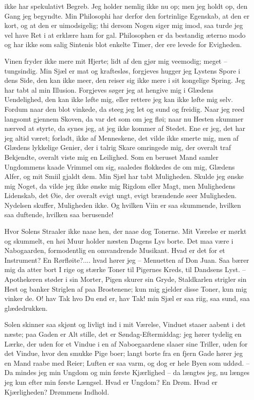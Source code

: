 \documentclass[12pt,a4paper]{article}
\begin{document}
ikke har spekulativt Begreb. Jeg holder nemlig ikke nu op; men jeg holdt op, den Gang jeg begyndte. Min Philosophi har derfor den fortrinlige Egenskab, at den er kort, og at den er uimodsigelig; thi dersom Nogen siger mig imod, saa turde jeg vel have Ret i at erklære ham for gal. Philosophen er da bestandig æterno modo og har ikke som salig Sintenis blot enkelte Timer, der ere levede for Evigheden.

Vinen fryder ikke mere mit Hjerte; lidt af den gjør mig veemodig; meget – tungsindig. Min Sjæl er mat og kraftesløs, forgjeves hugger jeg Lystens Spore i dens Side, den kan ikke meer, den reiser sig ikke mere i sit kongelige Spring. Jeg har tabt al min Illusion. Forgjeves søger jeg at hengive mig i Glædens Uendelighed, den kan ikke løfte mig, eller rettere jeg kan ikke løfte mig selv. Fordum naar den blot vinkede, da steeg jeg let og sund og freidig. Naar jeg reed langsomt gjennem Skoven, da var det som om jeg fløi; naar nu Hesten skummer nærved at styrte, da synes jeg, at jeg ikke kommer af Stedet. Ene er jeg, det har jeg altid været; forladt, ikke af Menneskene, det vilde ikke smerte mig, men af Glædens lykkelige Genier, der i talrig Skare omringede mig, der overalt traf Bekjendte, overalt viste mig en Leilighed. Som en beruset Mand samler Ungdommens kaade Vrimmel om sig, saaledes flokkedes de om mig, Glædens Alfer, og mit Smiil gjaldt dem. Min Sjæl har tabt Muligheden. Skulde jeg ønske mig Noget, da vilde jeg ikke ønske mig Rigdom eller Magt, men Mulighedens Lidenskab, det Øie, der overalt evigt ungt, evigt brændende seer Muligheden. Nydelsen skuffer, Muligheden ikke. Og hvilken Viin er saa skummende, hvilken saa duftende, hvilken saa berusende!

Hvor Solens Straaler ikke naae hen, der naae dog Tonerne. Mit Værelse er mørkt og skummelt, en høi Muur holder næsten Dagens Lys borte. Det maa være i Nabogaarden, formodentlig en omvandrende Musikant. Hvad er det for et Instrument? En Rørfløite?.... hvad hører jeg – Menuetten af Don Juan. Saa bærer mig da atter bort I rige og stærke Toner til Pigernes Kreds, til Dandsens Lyst. – Apothekeren støder i sin Morter, Pigen skurer sin Gryde, Staldkarlen strigler sin Hest og banker Striglen af paa Brostenene; kun mig gjelder disse Toner, kun mig vinker de. O! hav Tak hvo Du end er, hav Tak! min Sjæl er saa riig, saa sund, saa glædedrukken.

Solen skinner saa skjønt og livligt ind i mit Værelse, Vinduet staaer aabent i det næste; paa Gaden er Alt stille, det er Søndag-Eftermiddag: jeg hører tydelig en Lærke, der uden for et Vindue i en af Naboegaardene slaaer sine Triller, uden for det Vindue, hvor den smukke Pige boer; langt borte fra en fjern Gade hører jeg en Mand raabe med Reier; Luften er saa varm, og dog er hele Byen som uddød. – Da mindes jeg min Ungdom og min første Kjærlighed – da længtes jeg, nu længes jeg kun efter min første Længsel. Hvad er Ungdom? En Drøm. Hvad er Kjærligheden? Drømmens Indhold.
\end{document}
